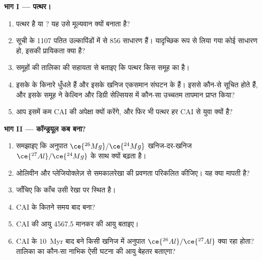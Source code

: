 \begin{problem}
\medskip
\noindent\textbf{भाग I --- पत्थर।}
\begin{enumerate}
  \item पत्थर  है या ? यह उसे मूल्यवान क्यों बनाता है?
  \item सूची के \num{1107} पतित उल्कापिंडों में से 856 साधारण  हैं। यादृच्छिक
        रूप से लिया गया कोई  साधारण  हो, इसकी प्रायिकता क्या है?
  \item {} समूहों की तालिका की सहायता से बताइए कि पत्थर किस समूह का है।
  \item इसके  के किनारे धुँधले हैं और इसके खनिज एकसमान
        संघटन के हैं। इससे कौन-से  सूचित होते हैं, और इसके समूह ने
        केल्विन और डिग्री सेल्सियस में कौन-सा उच्चतम तापमान प्राप्त किया?
  \item आप इसमें कम CAI की अपेक्षा क्यों करेंगे, और फिर भी पत्थर
        हर CAI से युवा क्यों है?
\end{enumerate}

\noindent\textbf{भाग II --- कॉन्ड्रयूल कब बना?}
\begin{enumerate}[resume]
  \item समझाइए कि अनुपात $\ce{^{26}Mg}/\ce{^{24}Mg}$ खनिज-दर-खनिज
        $\ce{^{27}Al}/\ce{^{24}Mg}$ के साथ क्यों बढ़ता है।
  \item ओलिवीन और प्लेजियोक्लेज़ से समकालरेखा की प्रवणता परिकलित कीजिए।
        यह क्या मापती है?
  \item जाँचिए कि काँच उसी रेखा पर स्थित है।
  \item {} CAI के कितने समय बाद बना?
  \item CAI की आयु \qty{4567.5}{\Ma} मानकर  की आयु बताइए।
  \item CAI के \qty{10}{Myr} बाद बने किसी खनिज में अनुपात $\ce{^{26}Al}/\ce{^{27}Al}$
        क्या रहा होता? तालिका का कौन-सा नाभिक ऐसी घटना की
        आयु बेहतर बताएगा?
\end{enumerate}


\end{problem}
